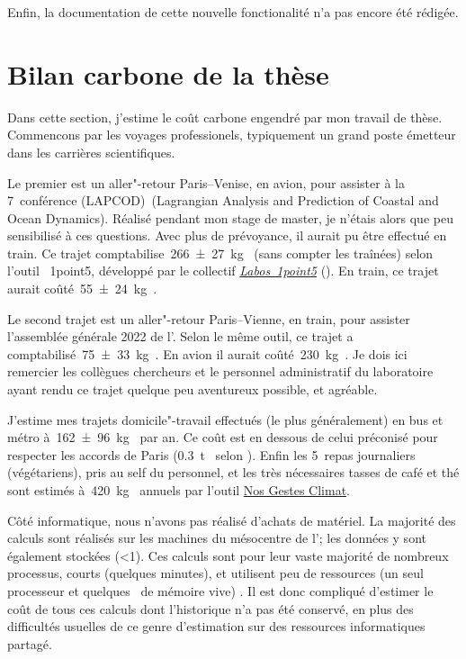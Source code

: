 Enfin, la documentation de cette nouvelle fonctionalité n'a pas encore été rédigée.


\chapter{Bilan carbone de la thèse}
\label{ax:bilan-carbone}

Dans cette section, j'estime le coût carbone engendré par mon travail de thèse.
Commencons par les voyages professionels, typiquement un grand poste émetteur dans les carrières scientifiques.

Le premier est un aller"-retour Paris--Venise, en avion, pour assister à la 7\ieme~conférence \abbrv(LAPCOD)~(Lagrangian Analysis and Prediction of Coastal and Ocean Dynamics).
Réalisé pendant mon stage de master, je n'étais alors que peu sensibilisé à ces questions. Avec plus de prévoyance, il aurait pu être effectué en train.
Ce trajet comptabilise~\qty{266 \pm 27}{\kg\carbone} (sans compter les traînées) selon l'outil ~1point5, développé par le collectif \href{https://labos1point5.org/}{\textit{Labos~1point5}} (\cite{mariette_2022}).
En train, ce trajet aurait coûté~\qty{55 \pm 24}{\kg\carbone}.

Le second trajet est un aller"-retour Paris--Vienne, en train, pour assister l'assemblée générale 2022 de l'.
Selon le même outil, ce trajet a comptabilisé~\qty{75 \pm 33}{\kg\carbone}.
En avion il aurait coûté~\qty{230}{\kg\carbone}.
Je dois ici remercier les collègues chercheurs et le personnel administratif du laboratoire ayant rendu ce trajet quelque peu aventureux possible, et agréable.

J'estime  mes trajets domicile"-travail effectués (le plus généralement) en bus et métro à~\qty{162 \pm 96}{\kg\carbone} par an.
Ce coût est en dessous de celui préconisé pour respecter les accords de Paris (\qty{0.3}{\tonne\carbone} selon \textcite{dugast_2019}).
Enfin les 5~repas journaliers (végétariens), pris au self du personnel, et les très nécessaires tasses de café et thé sont estimés à~\qty{420}{\kg\carbone} annuels par l'outil \href{https://nosgestesclimat.fr}{Nos Gestes Climat}.

Côté informatique, nous n'avons pas réalisé d'achats de matériel.
La majorité des calculs sont réalisés sur les machines du mésocentre de l'; les données y sont également stockées (\qty{<1}{\To}).
Ces calculs sont pour leur vaste majorité de nombreux processus, courts (quelques minutes), et utilisent peu de ressources (un seul processeur et quelques~\unit{\Go} de mémoire vive) .
Il est donc compliqué d'estimer le coût de tous ces calculs dont l'historique n'a pas été conservé, en plus des difficultés usuelles de ce genre d'estimation sur des ressources informatiques partagé.

